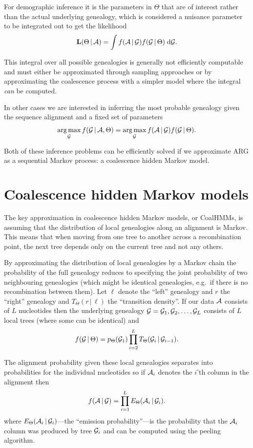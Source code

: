 For demographic inference it is the parameters in $\Theta$ that are of interest rather than the actual underlying genealogy, which is considered a nuisance parameter to be integrated out to get the likelihood
\[
    \mathbf{L}(\Theta\,|\,\mathcal{A}) = \int f(\mathcal{A}\,|\,\mathcal{G}) f(\mathcal{G}\,|\,\Theta) \mathrm{\;d}\mathcal{G} .
\]

This integral over all possible genealogies is generally not efficiently computable and must either be approximated through sampling approaches or by approximating the coalescence process with a simpler model where the integral \emph{can} be computed. 

In other cases we are interested in inferring the most probable genealogy given the sequence alignment and a fixed set of parameters
\begin{displaymath}
  \operatorname*{arg\,max}_{\mathcal{G}} f(\mathcal{G}\,|\,\mathcal{A},\Theta) = 
  \operatorname*{arg\,max}_{\mathcal{G}} f(\mathcal{A}\,|\,\mathcal{G}) f(\mathcal{G}\,|\,\Theta)
  .
\end{displaymath}

Both of these inference problems can be efficiently solved if we approximate ARG as a sequential Markov process: a coalescence hidden Markov model.

\section{Coalescence hidden Markov models}

The key approximation in coalescence hidden Markov models, or CoalHMMs, is assuming that the distribution of local genealogies along an alignment is Markov. This means that when moving from one tree to another across a recombination point, the next tree depends only on the current tree and not any others. 

By approximating the distribution of local genealogies by a Markov chain the probability of the full genealogy reduces to specifying the joint probability of two neighbouring genealogies (which might be identical genealogies, e.g.\ if there is no recombination between them). Let $\ell$ denote the ``left'' genealogy and $r$ the ``right'' genealogy and $T_\Theta(r \,|\, \ell)$ the ``transition density''. If our data $\mathcal{A}$ consists of $L$ nucleotides then the underlying genealogy $\mathcal{G}=\mathcal{G}_1,\mathcal{G}_2,\ldots,\mathcal{G}_L$  consists of $L$ local trees (where some can be identical) and
\[
    f(\mathcal{G}\,|\,\Theta) = p_\Theta(\mathcal{G}_1) \prod_{i=2}^L T_\Theta(\mathcal{G}_i\,|\,\mathcal{G}_{i-1}) .
\]

The alignment probability given these local genealogies separates into probabilities for the individual nucleotides so if $\mathcal{A}_i$ denotes the $i$'th column in the alignment then
\[
    f(\mathcal{A}\,|\,\mathcal{G}) = \prod_{i=1}^L E_\Theta(\mathcal{A}_i\,|\,\mathcal{G}_i) .
\]
where $E_\Theta(\mathcal{A}_i\,|\,\mathcal{G}_i)$---the ``emission probability''---is the probability that the $\mathcal{A}_i$ column was produced by tree $\mathcal{G}_i$ and can be computed using the peeling algorithm.

